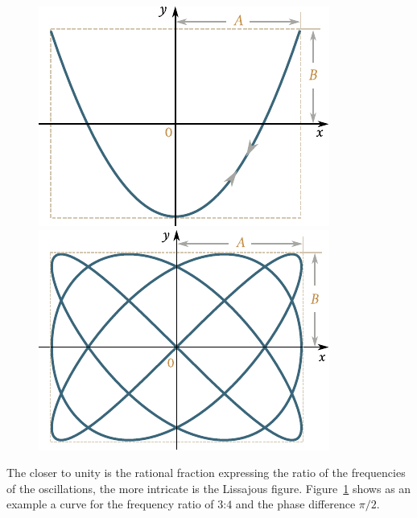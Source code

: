 \begin{figure}[t]
	\begin{minipage}[t]{0.5\linewidth}
		\begin{center}
			\includegraphics[scale=0.95]{figures/ch_07/fig_7_17.pdf}
			\caption[]{}
			\label{fig:7_17}
		\end{center}
	\end{minipage}
	\hspace{-0.05cm}
	\begin{minipage}[t]{0.5\linewidth}
		\begin{center}
			\includegraphics[scale=0.95]{figures/ch_07/fig_7_18.pdf}
			\caption[]{}
			\label{fig:7_18}
		\end{center}
	\end{minipage}
	\vspace{-0.6cm}
\end{figure}

The closer to unity is the rational fraction expressing the ratio of the frequencies of the oscillations, the more intricate is the Lissajous figure. Figure~\ref{fig:7_18} shows as an example a curve for the frequency ratio of $3$:$4$ and the phase difference $\pi/2$.

